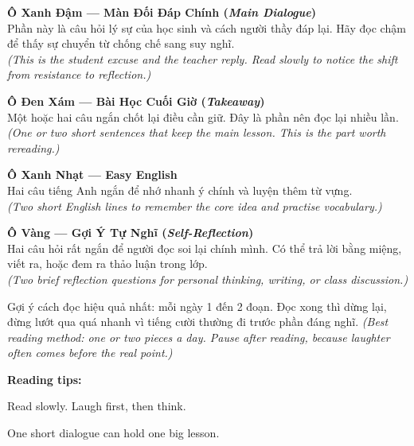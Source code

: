 \begin{tcolorbox}[
  colback=sunclay!8,
  colframe=sunclay!70!black,
  coltitle=black,
  fonttitle=\bfseries,
  title={Giải Thích Các Ô Trong Sách \quad\textit{\small(Book Guide)}},
  arc=4pt, boxrule=1pt, breakable, enhanced
]

\smallskip
\textbf{Ô Xanh Đậm --- Màn Đối Đáp Chính (\textit{Main Dialogue})}\\
Phần này là câu hỏi lý sự của học sinh và cách người thầy đáp lại. Hãy đọc chậm để thấy sự chuyển từ chống chế sang suy nghĩ.\\
\textit{(This is the student excuse and the teacher reply. Read slowly to notice the shift from resistance to reflection.)}

\medskip
\textbf{Ô Đen Xám --- Bài Học Cuối Giờ (\textit{Takeaway})}\\
Một hoặc hai câu ngắn chốt lại điều cần giữ. Đây là phần nên đọc lại nhiều lần.\\
\textit{(One or two short sentences that keep the main lesson. This is the part worth rereading.)}

\medskip
\textbf{Ô Xanh Nhạt --- Easy English}\\
Hai câu tiếng Anh ngắn để nhớ nhanh ý chính và luyện thêm từ vựng.\\
\textit{(Two short English lines to remember the core idea and practise vocabulary.)}

\medskip
\textbf{Ô Vàng --- Gợi Ý Tự Nghĩ (\textit{Self-Reflection})}\\
Hai câu hỏi rất ngắn để người đọc soi lại chính mình. Có thể trả lời bằng miệng, viết ra, hoặc đem ra thảo luận trong lớp.\\
\textit{(Two brief reflection questions for personal thinking, writing, or class discussion.)}

\smallskip
\end{tcolorbox}

\vspace{6pt}

\begin{baihoc}
Gợi ý cách đọc hiệu quả nhất: mỗi ngày 1 đến 2 đoạn. Đọc xong thì dừng lại, đừng lướt qua quá nhanh vì tiếng cười thường đi trước phần đáng nghĩ.
\textit{(Best reading method: one or two pieces a day. Pause after reading, because laughter often comes before the real point.)}
\end{baihoc}

\begin{ghinhoanh}
\textbf{Reading tips:}

Read slowly. Laugh first, then think.

One short dialogue can hold one big lesson.
\end{ghinhoanh}

\ngancach